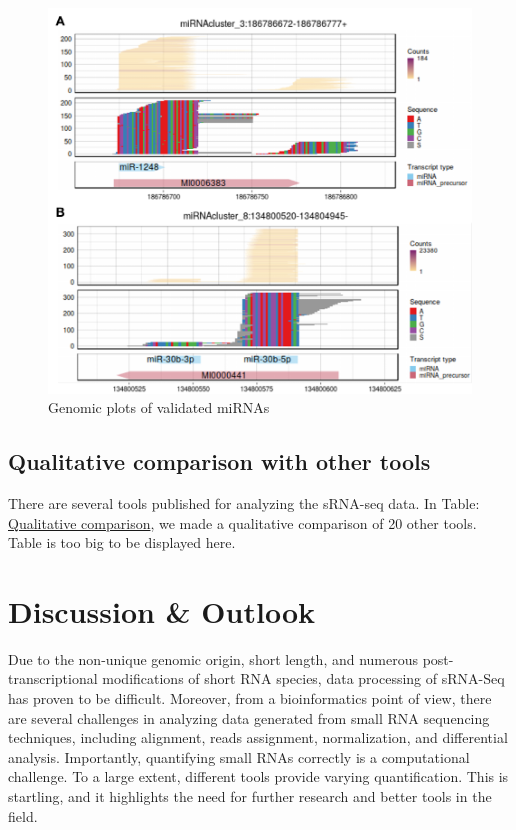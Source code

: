 \documentclass[12pt,twoside]{reedthesis}
\begin{document}
\begin{subfigures}
\begin{figure}[htbp]
{\centering \includegraphics{thesis_files/figure-latex/3f18b-1} 

}

\caption{Genomic plots of validated miRNAs}\label{fig:3f18b}
\end{figure}
\end{subfigures}
\hypertarget{qualitative-comparison-with-other-tools}{%
\subsection{Qualitative comparison with other tools}\label{qualitative-comparison-with-other-tools}}

There are several tools published for analyzing the sRNA-seq data. In
Table: \href{figures/shortRNA/in/t3.xlsx}{Qualitative comparison}, we made a
qualitative comparison of 20 other tools. Table is too big to be
displayed here.

\hypertarget{discussion-outlook}{%
\section{Discussion \& Outlook}\label{discussion-outlook}}

Due to the non-unique genomic origin, short length, and numerous
post-transcriptional modifications of short RNA species, data processing
of sRNA-Seq has proven to be difficult. Moreover, from a bioinformatics
point of view, there are several challenges in analyzing data generated
from small RNA sequencing techniques, including alignment, reads
assignment, normalization, and differential analysis. Importantly,
quantifying small RNAs correctly is a computational challenge. To a
large extent, different tools provide varying quantification. This is
startling, and it highlights the need for further research and better
tools in the field.
\end{document}
